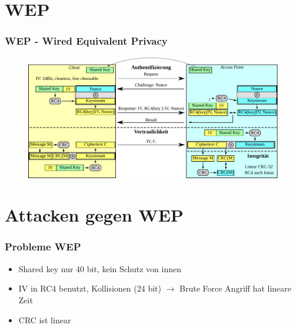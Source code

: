 \documentclass{beamer}
\begin{document}
\section{WEP}
\begin{frame}
\frametitle{WEP - Wired Equivalent Privacy}
\begin{figure}
	\includegraphics[width=1.0\linewidth]{figures/WEP_complete.pdf}
\end{figure}
\end{frame}


\section{Attacken gegen WEP}
\begin{frame}
\frametitle{Probleme WEP}
\begin{itemize}
	\item Shared key nur 40 bit, kein Schutz von innen
	\item IV in RC4 benutzt, Kollisionen (24 bit) $\rightarrow$ Brute Force Angriff hat lineare Zeit
	\item CRC ist linear
\end{itemize}

\end{frame}
\end{document}
